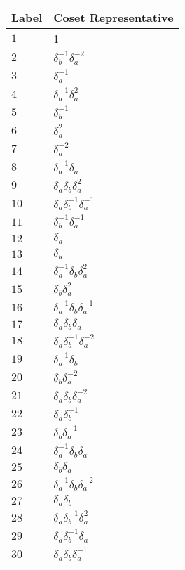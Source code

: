 \documentclass{article}
\begin{document}

\begin{center}
\begin{tabular}{ll}
\toprule
Label & Coset Representative\\
\midrule
$1$ & 1 \\
$2$ & $\delta_b^{-1}\delta_a^{-2}$ \\
$3$ & $\delta_a^{-1}$ \\
$4$ & $\delta_b^{-1}\delta_a^{2}$ \\
$5$ & $\delta_b^{-1}$ \\
$6$ & $\delta_a^{2}$ \\
$7$ & $\delta_a^{-2}$ \\
$8$ & $\delta_b^{-1}\delta_a^{}$ \\
$9$ & $\delta_a^{}\delta_b^{}\delta_a^{2}$ \\
$10$ & $\delta_a^{}\delta_b^{-1}\delta_a^{-1}$ \\
$11$ & $\delta_b^{-1}\delta_a^{-1}$ \\
$12$ & $\delta_a^{}$ \\
$13$ & $\delta_b^{}$ \\
$14$ & $\delta_a^{-1}\delta_b^{}\delta_a^{2}$ \\
$15$ & $\delta_b^{}\delta_a^{2}$ \\
$16$ & $\delta_a^{-1}\delta_b^{}\delta_a^{-1}$ \\
$17$ & $\delta_a^{}\delta_b^{}\delta_a^{}$ \\
$18$ & $\delta_a^{}\delta_b^{-1}\delta_a^{-2}$ \\
$19$ & $\delta_a^{-1}\delta_b^{}$ \\
$20$ & $\delta_b^{}\delta_a^{-2}$ \\
$21$ & $\delta_a^{}\delta_b^{}\delta_a^{-2}$ \\
$22$ & $\delta_a^{}\delta_b^{-1}$ \\
$23$ & $\delta_b^{}\delta_a^{-1}$ \\
$24$ & $\delta_a^{-1}\delta_b^{}\delta_a^{}$ \\
$25$ & $\delta_b^{}\delta_a^{}$ \\
$26$ & $\delta_a^{-1}\delta_b^{}\delta_a^{-2}$ \\
$27$ & $\delta_a^{}\delta_b^{}$ \\
$28$ & $\delta_a^{}\delta_b^{-1}\delta_a^{2}$ \\
$29$ & $\delta_a^{}\delta_b^{-1}\delta_a^{}$ \\
$30$ & $\delta_a^{}\delta_b^{}\delta_a^{-1}$ \\

\end{tabular}
\end{center}
\end{document}
